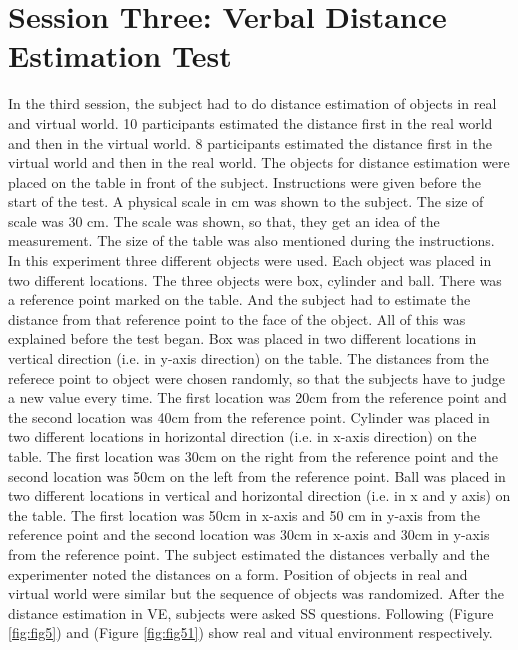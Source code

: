 \section{Session Three: Verbal Distance Estimation Test}
In the third session, the subject had to do distance estimation of objects in real and virtual world. 10 participants estimated the distance first in the real world and then in the virtual world. 8 participants estimated the distance first in the virtual world and then in the real world. The objects for distance estimation were placed on the table in front of the subject. Instructions were given before the start of the test. A physical scale in cm was shown to the subject. The size of scale was 30 cm. The scale was shown, so that, they get an idea of the measurement. The size of the table was also mentioned during the instructions. In this experiment three different objects were used. Each object was placed in two different locations. The three objects were box, cylinder and ball. There was a reference point marked on the table. And the subject had to estimate the distance from that reference point to the face of the object. All of this was explained before the test began. Box was placed in two different locations in vertical direction (i.e. in y-axis direction) on the table. The distances from the referece point to object were chosen randomly, so that the subjects have to judge a new value every time. The first location was 20cm from the reference point and the second location was 40cm from the reference point. Cylinder was placed in two different locations in horizontal direction (i.e. in x-axis direction) on the table. The first location was 30cm on the right from the reference point and the second location was 50cm on the left from the reference point. Ball was placed in two different locations in vertical and horizontal direction (i.e. in x and y axis) on the table. The first location was 50cm in x-axis and 50 cm in y-axis from the reference point and the second location was 30cm in x-axis and 30cm in y-axis from the reference point. The subject estimated the distances verbally and the experimenter noted the distances on a form. Position of objects in real and virtual world were similar but the sequence of objects was randomized. After the distance estimation in VE, subjects were asked SS questions. Following (Figure \ref{fig:fig5}) and (Figure \ref{fig:fig51}) show real and vitual environment respectively. 
